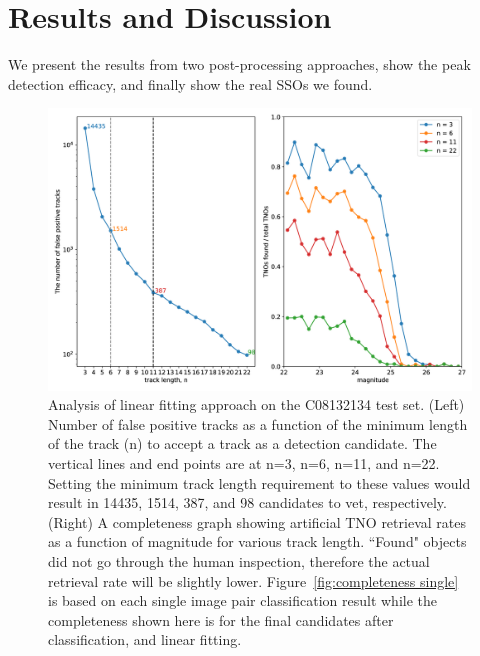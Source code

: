 \documentclass{aastex631}
\begin{document}

\section{Results and Discussion}
\label{sect: Results}

We present the results from two post-processing approaches, show the peak detection efficacy, and finally show the real SSOs we found.

\begin{figure}
    \centering
    \includegraphics[width=\textwidth,keepaspectratio]{Figures/completeness_after_linear_fitting.png}
    \caption{Analysis of linear fitting approach on the C08132134 test set. (Left) Number of false positive tracks as a function of the minimum length of the track (n) to accept a track as a detection candidate.
    The vertical lines and end points are at n=3, n=6, n=11, and n=22.
    Setting the minimum track length requirement to these values would result in 14435, 1514, 387, and 98 candidates to vet, respectively.
    (Right) A completeness graph showing artificial TNO retrieval rates as a function of magnitude for various track length.
    ``Found" objects did not go through the human inspection, therefore the actual retrieval rate will be slightly lower.
    Figure~\ref{fig:completeness single} is based on each single image pair classification result while the completeness shown here is for the final candidates after classification, and linear fitting.
    }
    \label{fig:completeness after Linear Fitting}
\end{figure}

\end{document}
